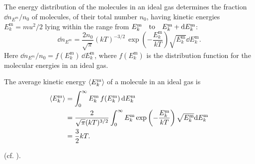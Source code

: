 \subsection{}\label{10.3.7} The energy distribution of the molecules in an ideal gas determines the fraction $\dd n_{E^{m}}/n_{0}$ of molecules, of their total number $n_{0}$, having kinetic energies $E_{k}^{\textrm{m}}= mu^{2}/2$ lying within the range from $E_{k}^{\textrm{m}} \qq{to} E_{k}^{\textrm{m}} + \dd E_{k}^{\textrm{m}}$:
\begin{equation*}%
\dd n_{E^{m}} = \frac{2 n_{0}}{\sqrt{\pi}} \left( kT \right)^{-3/2} \, \exp \left( -\frac{E_{k}^{\textrm{m}}}{kT} \right) \sqrt{E_{k}^{\textrm{m}}} \dd E_{k}^{\textrm{m}}.
\end{equation*}
Here $\dd n_{E^{m}}/n_{0} = f (E_{k}^{\textrm{m}} ) \,\dd E_{k}^{\textrm{m}}$, where $f(E_{k}^{\textrm{m}})$ is the distribution function for the molecular energies in an ideal gas. 

 The average kinetic energy $\expval{E_{k}^{\textrm{m}}}$ of a molecule in an ideal gas is
\begin{align*}%
\expval{E_{k}^{\textrm{m}}} & = \int_{0}^{\infty} E_{k}^{\textrm{m}} \, f(E_{k}^{\textrm{m}}) \, \dd E_{k}^{\textrm{m}} \\
& = \frac{2}{\sqrt{\pi} (kT)^{3/2}} \int_{0}^{\infty} E_{k}^{\textrm{m}} \exp \left(- \frac{E_{k}^{\textrm{m}}}{kT} \right) \sqrt{E_{k}^{\textrm{m}}} \dd E_{k}^{\textrm{m}}\\
& = \frac{3}{2} kT.
\end{align*}

(cf. ).

